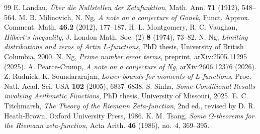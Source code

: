 \documentclass[10pt,a4paper]{amsart}
\numberwithin{equation}{section}
\begin{document}
\begin{thebibliography}{99}
 E. Landau, \emph{\"Uber die Nullstellen der Zetafunktion}, Math. Ann. \textbf{71} (1912), 548--564.
 M. B. Milinovich, N. Ng, \emph{A note on a conjecture of Gonek}, Funct. Approx. Comment. Math. \textbf{46.2} (2012), 177--187.
 H. L. Montgomery, R. C. Vaughan, \emph{Hilbert's inequality}, J. London Math. Soc. (2) \textbf{8} (1974), 73--82.
 N. Ng, \emph{Limiting distributions and zeros of Artin $L$-functions}, PhD thesis, University of British Columbia, 2000.
 N. Ng, \emph{Prime number error terms}, preprint, arXiv:2505.11295 (2025).
 A. Pearce-Crump, \emph{A note on a conjecture of Ng}, arXiv:2606.12376 (2026).
 Z. Rudnick, K. Soundararajan, \emph{Lower bounds for moments of $L$-functions}, Proc. Natl. Acad. Sci. USA \textbf{102} (2005), 6837--6838.
 S. Sinha, \emph{Some Conditional Results involving Arithmetic Functions}, PhD thesis, University of Missouri, 2025.
 E. C. Titchmarsh, \emph{The Theory of the Riemann Zeta-function}, 2nd ed., revised by D. R. Heath-Brown, Oxford University Press, 1986.
 K. M. Tsang, \emph{Some $\Omega$-theorems for the Riemann zeta-function}, Acta Arith. \textbf{46} (1986), no.~4, 369--395.
\end{thebibliography}
\end{document}
